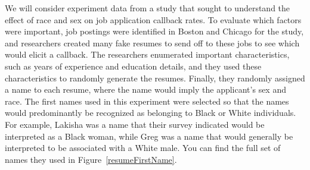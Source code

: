We will consider experiment data from a study that sought
to understand the effect of race and sex on job application
callback rates.
To evaluate which factors were important,
job postings were identified in Boston and Chicago
for the study,
and researchers created many fake resumes to send off
to these jobs to see which would elicit a callback.
The researchers enumerated important characteristics,
such as years of
experience and education details, and they used these
characteristics to randomly generate the resumes.
Finally, they randomly assigned a name to each resume,
where the name would imply the applicant's sex and race.
The first names used in this experiment were selected so that
the names would predominantly be
recognized as belonging to Black or White individuals.
For example, Lakisha was a name that their survey indicated
would be interpreted as a Black woman, while Greg was a name
that would generally be interpreted to be associated with
a White male.
You can find the full set of names they used in
Figure~\ref{resumeFirstName}.

